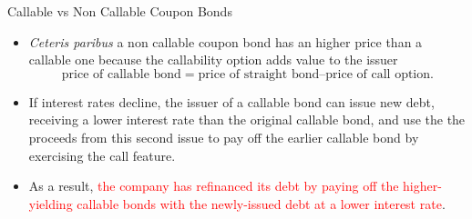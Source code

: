 \documentclass{beamer}
\begin{document}
\begin{frame}{Callable vs Non Callable Coupon Bonds}
\begin{itemize}
	\item<1-> \emph{Ceteris paribus} a non callable coupon bond has an higher price than a callable one because the callability option adds value to the issuer
	\begin{equation*}
		\text{price of callable bond} = \text{price of straight bond} – \text{price of call option}.
	\end{equation*}
	\item<2-> If interest rates decline, the issuer of a callable bond can issue new debt, receiving a lower interest rate than the original callable bond, and use the the proceeds from this second issue to pay off the earlier callable bond by exercising the call feature.
	\item<3-> As a result, \textcolor{red}{the company has refinanced its debt by paying off the higher-yielding callable bonds with the newly-issued debt at a lower interest rate}.		
\end{itemize}
\end{frame}

\end{document}
